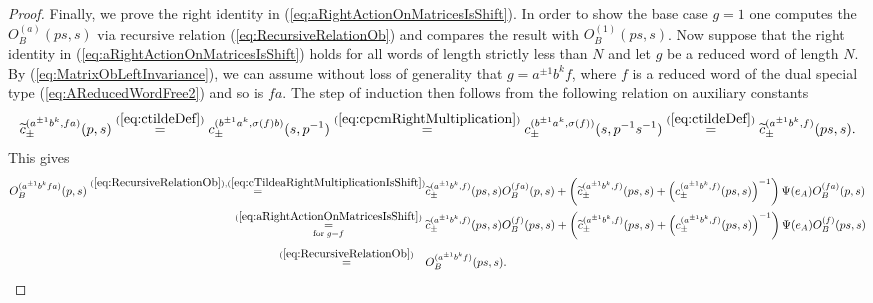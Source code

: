 \documentclass{amsart}
\begin{document}
\begin{proof}
Finally, we prove the right identity in (\ref{eq:aRightActionOnMatricesIsShift}). In order to show the base case $g=1$ one computes the $O_B^{(a)}(ps,s)$ via recursive relation (\ref{eq:RecursiveRelationOb}) and compares the result with $O_B^{(1)}(ps,s)$. Now suppose that the right identity in (\ref{eq:aRightActionOnMatricesIsShift}) holds for all words of length strictly less than $N$ and let $g$ be a reduced word of length $N$. By (\ref{eq:MatrixObLeftInvariance}), we can assume without loss of generality that $g=a^{\pm1}b^kf$, where $f$ is a reduced word of the dual special type (\ref{eq:AReducedWordFree2}) and so is $fa$. The step of induction then follows from the following relation on auxiliary constants
\begin{equation}
\widetilde c_{\pm}^{(a^{\pm1}b^k,fa)}(p,s)\overset{(\ref{eq:ctildeDef})}{=}c_{\pm}^{(b^{\pm1}a^k,\sigma(f)b)}(s,p^{-1})\overset{(\ref{eq:cpcmRightMultiplication})}{=}c_{\pm}^{(b^{\pm1}a^k,\sigma(f))}(s,p^{-1}s^{-1})\overset{(\ref{eq:ctildeDef})}{=}\widetilde c_{\pm}^{(a^{\pm1}b^k,f)}(ps,s).
\label{eq:cTildeaRightMultiplicationIsShift}
\end{equation}
This gives
\begin{align*}
O_B^{(a^{\pm1}b^kfa)}(p,s)\overset{(\ref{eq:RecursiveRelationOb}),(\ref{eq:cTildeaRightMultiplicationIsShift})}{=}&\widetilde c_{\pm}^{(a^{\pm1}b^k,f)}(ps,s)O_B^{(fa)}(p,s)+\left(\widetilde c_{\pm}^{(a^{\pm1}b^k,f)}(ps,s)+\left(c_{\pm}^{(a^{\pm1}b^k,f)}(ps,s)\right)^{-1}\right)\Psi(e_A)O_B^{(fa)}(p,s)\\
\overset{(\ref{eq:aRightActionOnMatricesIsShift})}{\underset{\textrm{for}\;g=f}{=}}\;&\widetilde c_{\pm}^{(a^{\pm1}b^k,f)}(ps,s)O_B^{(f)}(ps,s)+\left(\widetilde c_{\pm}^{(a^{\pm1}b^k,f)}(ps,s)+\left(c_{\pm}^{(a^{\pm1}b^k,f)}(ps,s)\right)^{-1}\right)\Psi(e_A)O_B^{(f)}(ps,s)\\[0.3em]
\overset{(\ref{eq:RecursiveRelationOb})}{=}\quad&O_B^{(a^{\pm1}b^kf)}(ps,s).
\end{align*}
\end{proof}
\end{document}
